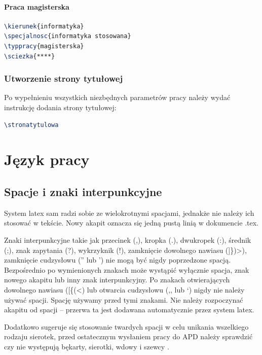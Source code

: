 \documentclass{wfiisul}
\begin{document}
\subsubsection{Praca magisterska}
\begin{lstlisting}[language=TeX, basicstyle=\ttfamily]
\kierunek{informatyka}
\specjalnosc{informatyka stosowana}
\typpracy{magisterska}
\sciezka{****}
\end{lstlisting}

\subsection{Utworzenie strony tytułowej}

Po wypełnieniu wszystkich niezbędnych parametrów pracy należy wydać instrukcję  dodania strony tytułowej:

\begin{lstlisting}[language=TeX, basicstyle=\ttfamily, inputencoding=utf8, extendedchars=false]
\stronatytulowa
\end{lstlisting}


\chapter{Język pracy}

\section{Spacje i znaki interpunkcyjne}
System latex sam radzi sobie ze wielokrotnymi spacjami, jednakże nie należy ich stosować w tekście. Nowy akapit oznacza się jedną pustą linią w dokumencie .tex. 

Znaki interpunkcyjne takie jak przecinek (,), kropka (.), dwukropek (:), średnik (;), znak zapytania (?), wykrzyknik (!), zamknięcie dowolnego nawiasu (]\})>), zamknięcie cudzysłowu ('' lub ') nie mogą być nigdy poprzedzone spacją. Bezpośrednio po wymienionych znakach może wystąpić wyłącznie spacja, znak nowego akapitu lub inny znak interpunkcyjny. Po znakach otwierających dowolnego nawiasu ([\{(<) lub otwarcia cudzysłowu (,, lub `) nigdy nie należy używać spacji. Spację używamy przed tymi znakami. Nie należy rozpoczynać akapitu od spacji – przerwa ta jest dodawana  automatycznie przez system latex.

Dodatkowo sugeruje się stosowanie twardych spacji w celu unikania wszelkiego rodzaju sierotek, przed ostatecznym wysłaniem pracy do APD należy sprawdzić czy nie występują  bękarty, sierotki, wdowy i szewcy \cite{Bekart}.
\end{document}
